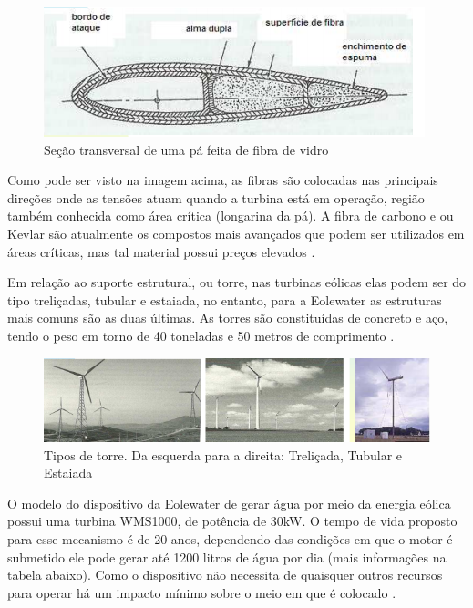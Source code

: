 \begin{figure}[!htbp]
\centering
\includegraphics[scale=0.80]{editaveis/figuras/pa}
\caption[Seção transversal de uma pá feita de fibra de vidro]{Seção transversal de uma pá feita de fibra de vidro\footnotemark}
\FloatBarrier
\label{secao_transversal_pa}
\end{figure}

Como pode ser visto na imagem acima, as fibras são colocadas nas principais direções onde as tensões atuam quando a turbina
está em operação, região também conhecida como área crítica (longarina da pá). A fibra de carbono e ou Kevlar são atualmente
os compostos mais avançados que podem ser utilizados em áreas críticas, mas tal material possui preços elevados \cite{barrosVarela}.

Em relação ao suporte estrutural, ou torre, nas turbinas eólicas elas podem ser do tipo treliçadas, tubular e estaiada,
no entanto, para a Eolewater as estruturas mais comuns são as duas últimas. As torres são constituídas de concreto e aço,
tendo o peso em torno de 40 toneladas e 50 metros de comprimento \cite{usp}.

\begin{figure}[!htb]
\centering
\includegraphics[scale=0.80]{editaveis/figuras/torre}
\caption[Tipos de torre]{Tipos de torre. Da esquerda para a direita: Treliçada, Tubular e Estaiada \footnotemark}
\FloatBarrier
\label{torre}
\end{figure}

O modelo do dispositivo da Eolewater de gerar água por meio da energia eólica possui uma turbina WMS1000, de potência de 30kW.
O tempo de vida proposto para esse mecanismo é de 20 anos, dependendo das condições em que o motor é submetido ele pode gerar
até 1200 litros de água por dia (mais informações na tabela abaixo). Como o dispositivo não necessita de quaisquer outros 
recursos para operar há um impacto mínimo sobre o meio em que é colocado \cite{renewable}.


